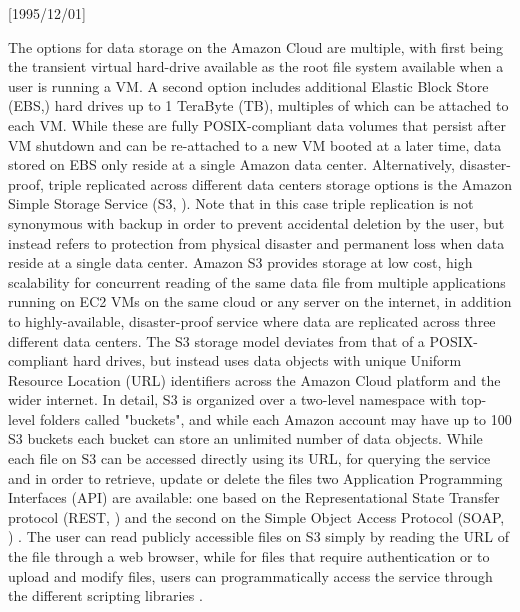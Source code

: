 \NeedsTeXFormat{LaTeX2e}[1995/12/01] \documentclass[10pt]{bmc_article}
\newenvironment{bmcformat}{\begin{raggedright}\baselineskip20pt\sloppy\setboolean{publ}{false}}{\end{raggedright}\baselineskip20pt\sloppy}
\begin{document}
\begin{bmcformat}
The options for data storage on the Amazon Cloud are multiple, with first being the transient virtual hard-drive 
available as the root file system available when a user is running a VM. A second option includes additional Elastic
Block Store (EBS,\cite{ebs}) hard drives up to 1 TeraByte (TB), multiples of which can be attached to each VM. While
these are fully POSIX-compliant \cite{} data volumes that persist after VM shutdown and can be re-attached to a
new VM booted at a later time, data stored on EBS only reside at a single Amazon data center.  Alternatively, disaster-
proof, triple replicated across different data centers storage options is the Amazon Simple Storage Service (S3, \cite{}). 
Note that in this case triple replication is not synonymous with backup in order to prevent accidental deletion by the user, 
but instead refers to protection from physical disaster and permanent loss when data reside at a single data center. 
Amazon S3 provides storage at low cost, high scalability for concurrent reading of the same data file from multiple
applications running on  EC2 VMs on the same cloud or any server on the internet, in addition to highly-available, 
disaster-proof service where data are replicated across three different data centers. The S3 storage model deviates
from that of a POSIX-compliant hard drives, but instead uses data objects with unique Uniform Resource Location (URL) 
identifiers across the Amazon Cloud platform and the wider internet. In detail, S3 is organized over a two-level 
namespace with top-level folders called "buckets", and while each Amazon account may have up to 100 S3 buckets
each bucket can store an unlimited number of data objects. While each file on S3 can be accessed directly using its
URL, for querying the service and in order to retrieve, update or delete the files two Application Programming Interfaces 
(API) are available: one based on the Representational State Transfer protocol (REST, \cite{fielding2000}) and the second 
on the Simple  Object Access Protocol (SOAP, \cite{soap}) . The user can read publicly accessible files on S3 simply by
reading the URL of the file through a web browser, while for files that require authentication or to upload
and modify files, users can programmatically access the service through the different scripting libraries  \cite{}. 


\end{bmcformat}
\end{document}
